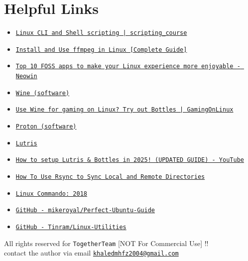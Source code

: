 \documentclass[12pt]{article}
\begin{document}
\section*{Helpful Links}

\begin{itemize}
    \item \href{https://learnbyexample.github.io/scripting_course/Linux_curated_resources.html}{\texttt{Linux CLI and Shell scripting | scripting\_course}}
    \item \href{https://itsfoss.com/ffmpeg/}{\texttt{Install and Use ffmpeg in Linux [Complete Guide]}}
    \item \href{https://www.neowin.net/guides/top-10-foss-apps-to-make-your-linux-experience-more-enjoyable/}{\texttt{Top 10 FOSS apps to make your Linux experience more enjoyable - Neowin}}
    \item \href{https://en.wikipedia.org/wiki/Wine_\%28software\%29}{\texttt{Wine (software)}}
    \item \href{https://www.gamingonlinux.com/2021/12/use-wine-for-gaming-on-linux-try-out-bottles/page\%3D2/}{\texttt{Use Wine for gaming on Linux? Try out Bottles | GamingOnLinux}}
    \item \href{https://en.wikipedia.org/wiki/Proton_\%28software\%29}{\texttt{Proton (software)}}
    \item \href{https://en.wikipedia.org/wiki/Lutris}{\texttt{Lutris}}
    \item \href{https://www.youtube.com/watch?v=xrWSZXJbR2I}{\texttt{How to setup Lutris \& Bottles in 2025! (UPDATED GUIDE) - YouTube}}
    \item \href{https://www.digitalocean.com/community/tutorials/how-to-use-rsync-to-sync-local-and-remote-directories}{\texttt{How To Use Rsync to Sync Local and Remote Directories}}
    \item \href{https://linuxcommando.blogspot.com/2018/}{\texttt{Linux Commando: 2018}}
    \item \href{https://github.com/mikeroyal/Perfect-Ubuntu-Guide}{\texttt{GitHub - mikeroyal/Perfect-Ubuntu-Guide}}
    \item \href{https://github.com/Tinram/Linux-Utilities}{\texttt{GitHub - Tinram/Linux-Utilities}}
\end{itemize}

\vspace{\fill}
\begin{center}
\color{muted}
All rights reserved for \texttt{TogetherTeam} [NOT For Commercial Use] !!\\
contact the author via email \href{mailto:khaledmhfz2004@gmail.com}{\texttt{khaledmhfz2004@gmail.com}}
\end{center}
\end{document}
